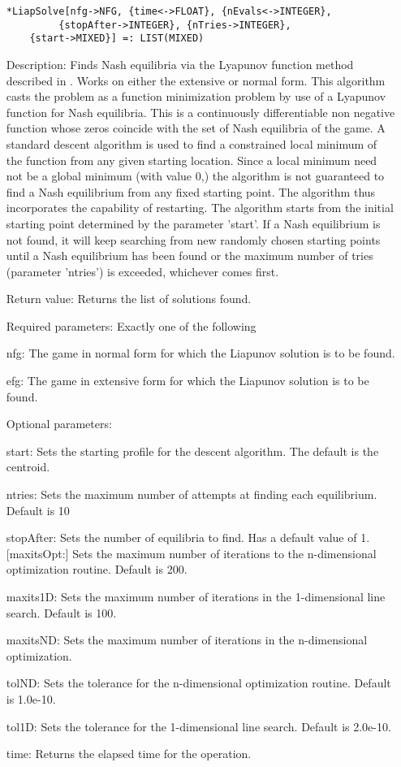\begin{itemize}
\protect \large \begin{verbatim}
*LiapSolve[nfg->NFG, {time<->FLOAT}, {nEvals<->INTEGER},
         {stopAfter->INTEGER}, {nTries->INTEGER},
	{start->MIXED}] =: LIST(MIXED)
\end{verbatim}\normalsize


\bd
\item
[Description:] Finds Nash equilibria via the Lyapunov function method
described in \cite[1991]{McK:91}.  Works on either the
extensive or normal form.  This algorithm casts the problem as a
function minimization problem by use of a Lyapunov function for Nash
equilibria.  This is a continuously differentiable non negative
function whose zeros coincide with the set of Nash equilibria of the
game.  A standard descent algorithm is used to find a constrained
local minimum of the function from any given starting location.  Since
a local minimum need not be a global minimum (with value 0,) the
algorithm is not guaranteed to find a Nash equilibrium from any fixed
starting point.  The algorithm thus incorporates the capability of
restarting.  The algorithm starts from the initial starting point
determined by the parameter 'start'.  If a Nash equilibrium is not
found, it will keep searching from new randomly chosen starting points
until a Nash equilibrium has been found or the maximum number of tries
(parameter 'ntries') is exceeded, whichever comes first.
\item
[Return value:] Returns the list of solutions found.
\item
[Required parameters:] Exactly one of the following \hfil\null

\bd
\item
[nfg:] The game in normal form for which the Liapunov solution is to
be found.
\item
[efg:] The game in extensive form for which the Liapunov solution is
to be found.
\ed

\item
[Optional parameters:]\hfil\null

\bd
\item
[start:] Sets the starting profile for the descent algorithm.  The
default is the centroid.
\item
[ntries:] Sets the maximum number of attempts at finding each
equilibrium. Default is 10
\item
[stopAfter:] Sets the number of equilibria to find.  Has a default
value of 1.  [maxitsOpt:] Sets the maximum number of iterations to the
n-dimensional optimization routine.  Default is 200.
\item
[maxits1D:] Sets the maximum number of iterations in the
1-dimensional line search.  Default is 100.
\item
[maxitsND:] Sets the maximum number of iterations in the
n-dimensional optimization.  
\item
[tolND:] Sets the tolerance for the n-dimensional optimization
routine.  Default is 1.0e-10.
\item
[tol1D:] Sets the tolerance for the 1-dimensional line search.
Default is 2.0e-10.
\item
[time:] Returns the elapsed time for the operation.
\ed
\ed


\end{itemize}
